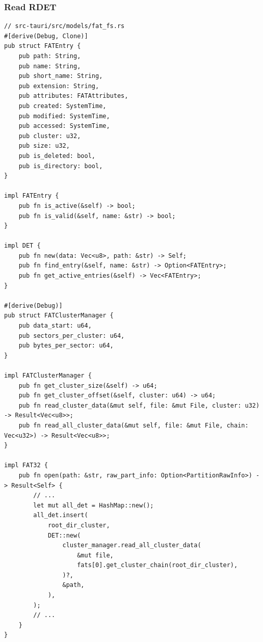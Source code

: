 \documentclass[a4paper,12pt]{report}
\begin{document}
\subsubsection*{Read RDET}
\begin{verbatim}
// src-tauri/src/models/fat_fs.rs
#[derive(Debug, Clone)]
pub struct FATEntry {
    pub path: String,
    pub name: String,
    pub short_name: String,
    pub extension: String,
    pub attributes: FATAttributes,
    pub created: SystemTime,
    pub modified: SystemTime,
    pub accessed: SystemTime,
    pub cluster: u32,
    pub size: u32,
    pub is_deleted: bool,
    pub is_directory: bool,
}

impl FATEntry {
    pub fn is_active(&self) -> bool;
    pub fn is_valid(&self, name: &str) -> bool;
}

impl DET {
    pub fn new(data: Vec<u8>, path: &str) -> Self;
    pub fn find_entry(&self, name: &str) -> Option<FATEntry>;
    pub fn get_active_entries(&self) -> Vec<FATEntry>;
}

#[derive(Debug)]
pub struct FATClusterManager {
    pub data_start: u64,
    pub sectors_per_cluster: u64,
    pub bytes_per_sector: u64,
}

impl FATClusterManager {
    pub fn get_cluster_size(&self) -> u64;
    pub fn get_cluster_offset(&self, cluster: u64) -> u64;
    pub fn read_cluster_data(&mut self, file: &mut File, cluster: u32) -> Result<Vec<u8>>;
    pub fn read_all_cluster_data(&mut self, file: &mut File, chain: Vec<u32>) -> Result<Vec<u8>>;
}

impl FAT32 {
    pub fn open(path: &str, raw_part_info: Option<PartitionRawInfo>) -> Result<Self> {
        // ...
        let mut all_det = HashMap::new();
        all_det.insert(
            root_dir_cluster,
            DET::new(
                cluster_manager.read_all_cluster_data(
                    &mut file,
                    fats[0].get_cluster_chain(root_dir_cluster),
                )?,
                &path,
            ),
        );
        // ...
    }
}
\end{verbatim}
\end{document}
